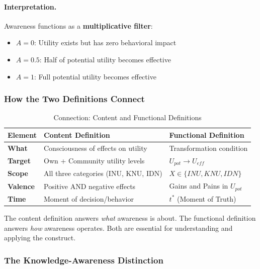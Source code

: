 \paragraph{Interpretation.}
Awareness functions as a \textbf{multiplicative filter}:
\begin{itemize}
\item $A = 0$: Utility exists but has zero behavioral impact
\item $A = 0.5$: Half of potential utility becomes effective
\item $A = 1$: Full potential utility becomes effective
\end{itemize}

\subsubsection{How the Two Definitions Connect}

\begin{table}[htbp]
\centering
\caption{Connection: Content and Functional Definitions}
\label{tab:definition-connection}
\renewcommand{\arraystretch}{1.4}
\begin{tabular}{@{}lp{5cm}p{5cm}@{}}
\toprule
\textbf{Element} & \textbf{Content Definition} & \textbf{Functional Definition} \\
\midrule
\textbf{What} & Consciousness of effects on utility & Transformation condition \\
\textbf{Target} & Own + Community utility levels & $U_{pot} \rightarrow U_{eff}$ \\
\textbf{Scope} & All three categories (INU, KNU, IDN) & $X \in \{INU, KNU, IDN\}$ \\
\textbf{Valence} & Positive AND negative effects & Gains and Pains in $U_{pot}$ \\
\textbf{Time} & Moment of decision/behavior & $t^*$ (Moment of Truth) \\
\bottomrule
\end{tabular}
\end{table}

The content definition answers \emph{what} awareness is about.
The functional definition answers \emph{how} awareness operates.
Both are essential for understanding and applying the construct.

\subsubsection{The Knowledge-Awareness Distinction}

